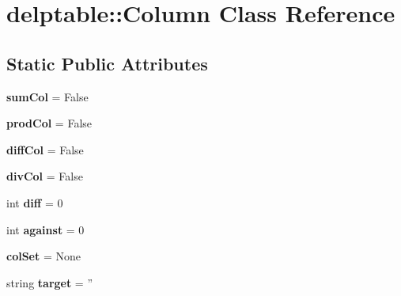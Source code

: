 \hypertarget{classdelptable_1_1Column}{
\section{delptable::Column Class Reference}
\label{classdelptable_1_1Column}
}
\subsection*{Static Public Attributes}
\begin{DoxyCompactItemize}
\item 
\hypertarget{classdelptable_1_1Column_ab9812c209eea10e05ccaa82085639e51}{
{\bfseries sumCol} = False}
\label{classdelptable_1_1Column_ab9812c209eea10e05ccaa82085639e51}

\item 
\hypertarget{classdelptable_1_1Column_aa2492b7e4b6b5ca0256ad376e8a69a91}{
{\bfseries prodCol} = False}
\label{classdelptable_1_1Column_aa2492b7e4b6b5ca0256ad376e8a69a91}

\item 
\hypertarget{classdelptable_1_1Column_ab72837529b2af0f6dc9dca7d4912c4b2}{
{\bfseries diffCol} = False}
\label{classdelptable_1_1Column_ab72837529b2af0f6dc9dca7d4912c4b2}

\item 
\hypertarget{classdelptable_1_1Column_a43f3c7dbf23f7b87409a80abf3121d0a}{
{\bfseries divCol} = False}
\label{classdelptable_1_1Column_a43f3c7dbf23f7b87409a80abf3121d0a}

\item 
\hypertarget{classdelptable_1_1Column_a31b413aa0b9f7c14800e5d0b4f255000}{
int {\bfseries diff} = 0}
\label{classdelptable_1_1Column_a31b413aa0b9f7c14800e5d0b4f255000}

\item 
\hypertarget{classdelptable_1_1Column_ae1f9d25f9bd7483128057426d5fc8e8c}{
int {\bfseries against} = 0}
\label{classdelptable_1_1Column_ae1f9d25f9bd7483128057426d5fc8e8c}

\item 
\hypertarget{classdelptable_1_1Column_a1b49c3691610390e6cec5e5e9bdbca3f}{
{\bfseries colSet} = None}
\label{classdelptable_1_1Column_a1b49c3691610390e6cec5e5e9bdbca3f}

\item 
\hypertarget{classdelptable_1_1Column_a428db0088ba5ebcff1ace502bdee3776}{
string {\bfseries target} = ''}
\label{classdelptable_1_1Column_a428db0088ba5ebcff1ace502bdee3776}


\end{DoxyCompactItemize}
